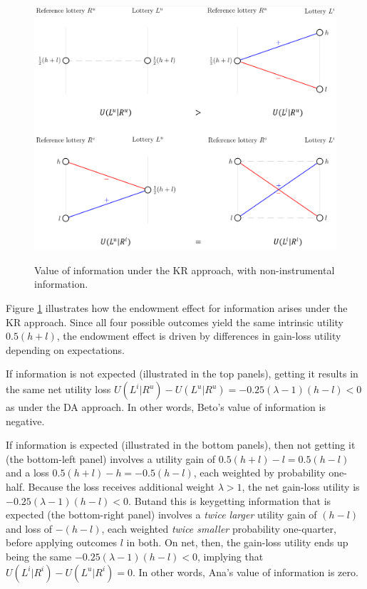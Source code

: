 \begin{figure}[ht]
  \caption{Value of information under the KR approach, with non-instrumental information.}\label{fig:nonInstrumental-KR}
  \begin{center}
  {\includegraphics[width=1\textwidth]{./figures/theory_fig2.png}}
  \end{center}
\end{figure}

Figure \ref{fig:nonInstrumental-KR} illustrates how the endowment effect for information arises under the KR approach. Since all four possible outcomes yield the same intrinsic utility $0.5(h+l)$, the endowment effect is driven by differences in gain-loss utility depending on expectations.

If information is not expected (illustrated in the top panels), getting it results in the same net utility loss $U(L^i|R^u)-U(L^u|R^u)=-0.25(\lambda-1)(h-l)<0$ as under the DA approach. In other words, Beto's value of information is negative.

If information is expected (illustrated in the bottom panels), then not getting it (the bottom-left panel) involves a utility gain of $0.5(h+l)-l=0.5(h-l)$ and a loss $0.5(h+l)-h=-0.5(h-l)$, each weighted by probability one-half. Because the loss receives additional weight $\lambda>1$, the net gain-loss utility is $-0.25(\lambda-1)(h-l)<0$. But\textemdash and this is key\textemdash getting information that is expected (the bottom-right panel) involves a \emph{twice larger} utility gain of $(h-l)$ and loss of $-(h-l)$, each weighted \emph{twice smaller} probability one-quarter, before applying outcomes $l$ in both. On net, then, the gain-loss utility ends up being the same $-0.25(\lambda-1)(h-l)<0$, implying that $U(L^i|R^i)-U(L^u|R^i)=0$. In other words, Ana's value of information is zero.

